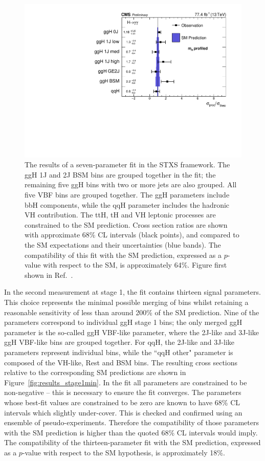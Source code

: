\begin{figure}[hptb]
  \centering
  \includegraphics[width=\textwidth]{Figures/Results/Stage1.pdf}
  \caption[Results of a seven-parameter fit in the STXS framework.]
  {
    The results of a seven-parameter fit in the STXS framework. 
    The ggH 1J and 2J BSM bins are grouped together in the fit; 
    the remaining five ggH bins with two or more jets are also grouped. 
    All five VBF bins are grouped together. 
    The ggH parameters include bbH components, 
    while the qqH parameter includes the hadronic VH contribution. 
    The ttH, tH and VH leptonic processes are constrained to the SM prediction. 
    Cross section ratios are shown with approximate 68\% CL intervals (black points), 
    and compared to the SM expectations and their uncertainties (blue bands).
    The compatibility of this fit with the SM prediction, 
    expressed as a $p$-value with respect to the SM, is approximately 64\%.
    Figure first shown in Ref.~\cite{HIG-18-029}.
  }
  \label{fig:results_stage1}
\end{figure}

In the second measurement at stage 1, the fit contains thirteen signal parameters.
This choice represents the minimal possible merging of bins 
whilst retaining a reasonable sensitivity of less than around 200\% of the SM prediction.
Nine of the parameters correspond to individual ggH stage 1 bins; 
the only merged ggH parameter is the so-called ggH VBF-like parameter, 
where the 2J-like and 3J-like ggH VBF-like bins are grouped together.
For qqH, the 2J-like and 3J-like parameters represent individual bins, 
while the ``qqH other" parameter is composed of the VH-like, Rest and BSM bins.
The resulting cross sections relative to the corresponding SM predictions 
are shown in Figure~\ref{fig:results_stage1min}.
In the fit all parameters are constrained to be non-negative -- this is necessary 
to ensure the fit converges.
The parameters whose best-fit values are constrained to be zero are known to have 68\% CL intervals 
which slightly under-cover. 
This is checked and confirmed using an ensemble of pseudo-experiments.
Therefore the compatibility of those parameters with the SM prediction is higher than 
the quoted 68\% CL intervals would imply.
The compatibility of the thirteen-parameter fit with the SM prediction, 
expressed as a $p$-value with respect to the SM hypothesis, is approximately 18\%.

